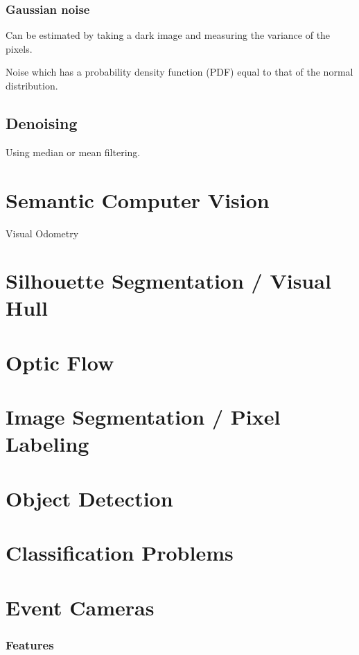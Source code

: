 \subsubsection{Gaussian noise}

Can be estimated by taking a dark image and measuring the variance of the pixels.

Noise which has a probability density function (PDF) equal to that of the normal distribution.

\subsection{Denoising}

Using median or mean filtering. 

\section{Semantic Computer Vision} 

Visual Odometry

\section{Silhouette Segmentation / Visual Hull}

\section{Optic Flow}


\section{Image Segmentation / Pixel Labeling}

\section{Object Detection}

\section{Classification Problems}


\section{Event Cameras}

\subsubsection{Features}

